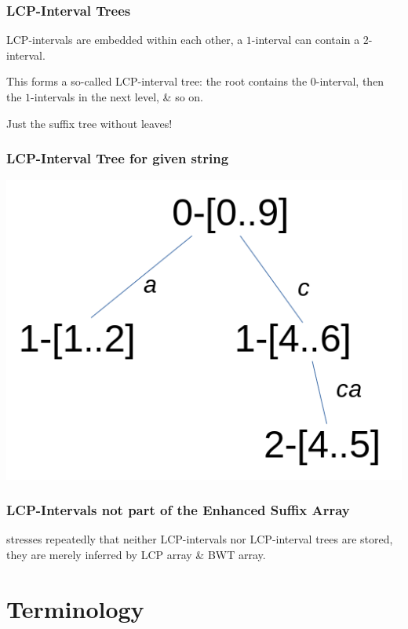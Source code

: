 \documentclass[compress,handout]{beamer} %
\begin{document}
\begin{frame}
	\frametitle{LCP-Interval Trees}
	LCP-intervals are embedded within each other, a $1$-interval
	can contain a $2$-interval.

	This forms a so-called LCP-interval tree: the root contains the $0$-interval,
	then the $1$-intervals in the next level, \& so on.

	Just the suffix tree without leaves!
\end{frame}

\begin{frame}
	\frametitle{LCP-Interval Tree for given string}
	\includegraphics[width=\textwidth, height=\textheight, keepaspectratio=true]{LCP_interval_tree}
\end{frame}

\begin{frame}
	\frametitle{LCP-Intervals not part of the Enhanced Suffix Array}
	\cite{abouelhoda2002enhanced} stresses repeatedly that neither
	LCP-intervals nor LCP-interval trees are stored, they are merely
	inferred by LCP array \& BWT array.
\end{frame}

\section{Terminology}
\end{document}
